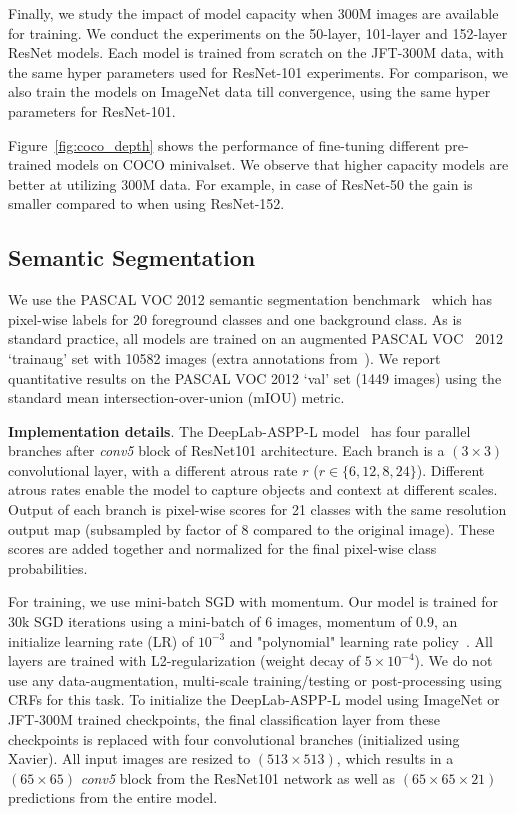 \documentclass[10pt,twocolumn,letterpaper]{article}
\newcommand{\minival}{minival\raisebox{0.2ex}{$\ast$}}
\begin{document}
Finally, we study the impact of model capacity when 300M images are available for training. We conduct the experiments on the 50-layer, 101-layer and 152-layer ResNet models. Each model is trained from scratch on the JFT-300M data, with the same hyper parameters used for ResNet-101 experiments. For comparison, we also train the models on ImageNet data till convergence, using the same hyper parameters for ResNet-101.

Figure~\ref{fig:coco_depth} shows the performance of fine-tuning different pre-trained models on COCO \minival set. We observe that higher capacity models are better at utilizing 300M data. For example, in case of ResNet-50 the gain is smaller compared to when using ResNet-152.

\subsection{Semantic Segmentation}
We use the PASCAL VOC 2012 semantic segmentation benchmark~\cite{voc} which has pixel-wise labels for 20 foreground classes and one background class. As is standard practice, all models are trained on an augmented PASCAL VOC~\cite{voc} 2012 `trainaug' set with 10582 images (extra annotations from~\cite{sbd}). We report quantitative results on the PASCAL VOC 2012 `val' set (1449 images) using the standard mean intersection-over-union (mIOU) metric.
 
\textbf{Implementation details}. The DeepLab-ASPP-L model~\cite{chen2016deeplab} has four parallel branches after \textit{conv5} block of ResNet101 architecture. Each branch is a $(3\times3)$ convolutional layer, with a different atrous rate $r$ ($r \in \{6, 12, 8, 24\}$). Different atrous rates enable the model to capture objects and context at different scales. Output of each branch is pixel-wise scores for 21 classes with the same resolution output map (subsampled by factor of 8 compared to the original image). These scores are added together and normalized for the final pixel-wise class probabilities.

For training, we use mini-batch SGD with momentum. Our model is trained for 30k SGD iterations using a mini-batch of 6 images, momentum of 0.9, an initialize learning rate (LR) of $10^{-3}$ and "polynomial" learning rate policy~\cite{chen2016deeplab}. All layers are trained with L2-regularization (weight decay of $5\times10^{-4}$). We do not use any data-augmentation, multi-scale training/testing or post-processing using CRFs for this task. To initialize the DeepLab-ASPP-L model using ImageNet or JFT-300M trained checkpoints, the final classification layer from these checkpoints is replaced with four convolutional branches (initialized using Xavier). All input images are resized to $(513\times513)$, which results in a $(65\times65)$ \textit{conv5} block from the ResNet101 network as well as $(65\times65\times21)$ predictions from the entire model.
\end{document}
